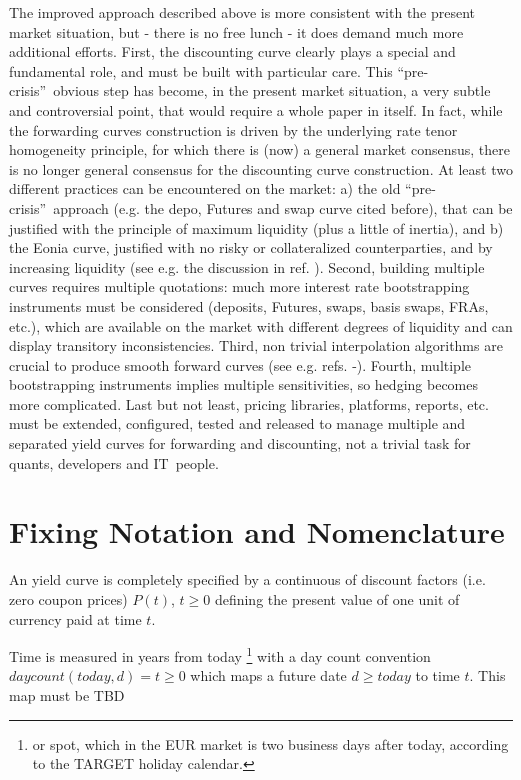 \documentclass[11pt,reqno]{amsart}
\begin{document}
The improved approach described above is more consistent with the present market situation, but - there is no free lunch - it does demand much more additional efforts. First, the discounting curve clearly plays a special and fundamental role, and must be built with particular care. This \textquotedblleft pre-crisis\textquotedblright\ obvious step has become, in the present market situation, a very subtle and controversial point, that would require a whole paper in itself. In fact, while the forwarding curves construction is driven by the underlying rate tenor homogeneity principle, for which there is (now) a general market consensus, there is no longer general consensus for the discounting curve construction. At least two different practices can be encountered on the market: a) the old
\textquotedblleft pre-crisis\textquotedblright\ approach (e.g. the depo, Futures and swap curve cited before), that can be justified with the principle of maximum liquidity (plus a little of inertia), and b) the Eonia curve, justified with no risky or collateralized counterparties, and by increasing liquidity (see e.g. the discussion in ref. \cite{Madigan2008}).
Second, building multiple curves requires multiple quotations: much more interest rate bootstrapping instruments must be considered (deposits, Futures, swaps, basis swaps, FRAs, etc.), which are available on the market with different degrees of liquidity and can display transitory inconsistencies.
Third, non trivial interpolation algorithms are crucial to produce smooth forward curves (see e.g. refs. \cite{HaganWest2008}-\cite{Andersen2005}).
Fourth, multiple bootstrapping instruments implies multiple sensitivities, so hedging becomes more complicated. Last but not least, pricing libraries, platforms, reports, etc. must be extended, configured, tested and released to manage multiple and separated yield curves for forwarding and discounting, not a trivial task for quants, developers and IT\ people.


\section{\label{SecMath}Fixing Notation and Nomenclature}
An yield curve is completely specified by a continuous of discount factors (i.e. zero coupon prices) $P(t) $, $t\geq 0$ defining the present value of one unit of currency paid at time $t$.

Time is measured in years from today \footnote{or spot, which in the EUR market is two business days after today, according to the TARGET holiday calendar.} with a day count convention $daycount\left(
today,d\right) =t\geq 0$ which maps a future date $d\geq today$ to time $t$.
This map must be TBD
\end{document}
